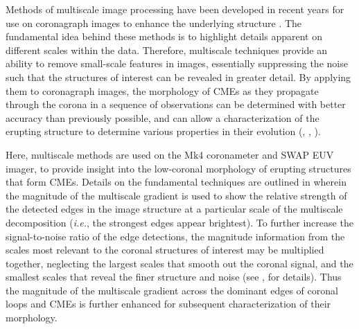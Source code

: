 \documentclass[namedreferences]{solarphysics}
\begin{document}
\begin{article}
Methods of multiscale image processing have been developed in recent years for use on coronagraph images to enhance the underlying structure \cite{2008ApJ...674.1201S,2008SoPh..248..457Y,2011AdSpR..47.2118G}. The fundamental idea behind these methods is to highlight details apparent on different scales within the data. Therefore, multiscale techniques provide an ability to remove small-scale features in images, essentially suppressing the noise such that the structures of interest can be revealed in greater detail. By applying them to coronagraph images, the morphology of CMEs as they propagate through the corona in a sequence of observations can be determined with better accuracy than previously possible, and can allow a characterization of the erupting structure to determine various properties in their evolution (, \citeyear{2010NatCo...1E..74B}, \citeyear{2012ApJ...752..145B}). %

Here, multiscale methods are used on the Mk4 coronameter and SWAP EUV imager, to provide insight into the low-coronal morphology of erupting structures that form CMEs. Details on the fundamental techniques are outlined in  wherein the magnitude of the multiscale gradient is used to show the relative strength of the detected edges in the image structure at a particular scale of the multiscale decomposition (\emph{i.e.}, the strongest edges appear brightest). To further increase the signal-to-noise ratio of the edge detections, the magnitude information from the scales most relevant to the coronal structures of interest may be multiplied together, neglecting the largest scales that smooth out the coronal signal, and the smallest scales that reveal the finer structure and noise (see , for details). Thus the magnitude of the multiscale gradient across the dominant edges of coronal loops and CMEs is further enhanced for subsequent characterization of their morphology. 


\end{article}
\end{document}
